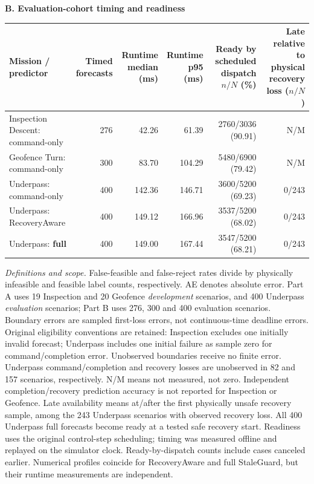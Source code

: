 \begin{table}[t]
\medskip
\textbf{B. Evaluation-cohort timing and readiness}\par\smallskip
\begin{tabular}{@{}lrrrrr@{}}
\toprule
Mission / predictor &
\shortstack{Timed\\forecasts} &
\shortstack{Runtime\\median (ms)} &
\shortstack{Runtime\\p95 (ms)} &
\shortstack{Ready by scheduled dispatch\\$n/N$ (\%)} &
\shortstack{Late relative to physical\\recovery loss ($n/N$)} \\
\midrule
Inspection Descent: command-only & 276 & 42.26 & 61.39 & 2760/3036 (90.91) & N/M \\
Geofence Turn: command-only & 300 & 83.70 & 104.29 & 5480/6900 (79.42) & N/M \\
\midrule
Underpass: command-only & 400 & 142.36 & 146.71 & 3600/5200 (69.23) & 0/243 \\
Underpass: RecoveryAware & 400 & 149.12 & 166.96 & 3537/5200 (68.02) & 0/243 \\
Underpass: \textbf{full} & 400 & 149.00 & 167.44 & 3547/5200 (68.21) & 0/243 \\
\bottomrule
\end{tabular}

\smallskip
\begin{minipage}{\textwidth}
\scriptsize
\textit{Definitions and scope.}
False-feasible and false-reject rates divide by physically infeasible and
feasible label counts, respectively. AE denotes absolute error.
Part A uses 19 Inspection and 20 Geofence \emph{development} scenarios,
and 400 Underpass \emph{evaluation} scenarios; Part B uses 276, 300 and
400 evaluation scenarios. Boundary errors are sampled first-loss errors,
not continuous-time deadline errors. Original eligibility conventions are
retained: Inspection excludes one initially invalid forecast; Underpass
includes one initial failure as sample zero for command/completion error.
Unobserved boundaries receive no finite error. Underpass command/completion
and recovery losses are unobserved in 82 and 157 scenarios, respectively.
N/M means not measured, not zero. Independent completion/recovery prediction
accuracy is not reported for Inspection or Geofence. Late availability
means at/after the first physically unsafe recovery sample, among the 243
Underpass scenarios with observed recovery loss. All 400 Underpass full
forecasts become ready at a tested safe recovery start.
Readiness uses the original control-step scheduling; timing was measured
offline and replayed on the simulator clock. Ready-by-dispatch counts
include cases canceled earlier. Numerical profiles coincide for
RecoveryAware and full StaleGuard, but their runtime measurements are independent.
\end{minipage}
\endgroup
\end{table}
